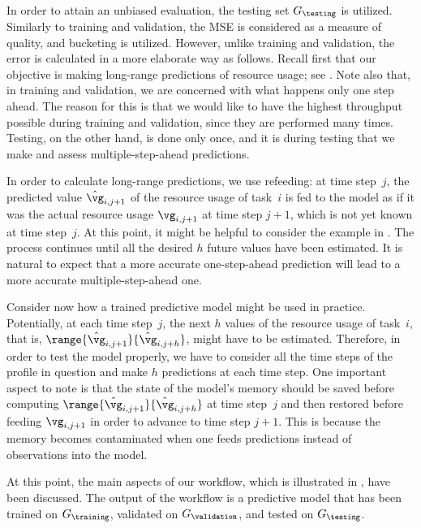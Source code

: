 In order to attain an unbiased evaluation, the testing set $G_\testing$ is
utilized. Similarly to training and validation, the \ac{MSE} is considered as a
measure of quality, and bucketing is utilized. However, unlike training and
validation, the error is calculated in a more elaborate way as follows. Recall
first that our objective is making long-range predictions of resource usage; see
. Note also that, in training and validation, we are
concerned with what happens only one step ahead. The reason for this is that we
would like to have the highest throughput possible during training and
validation, since they are performed many times. Testing, on the other hand, is
done only once, and it is during testing that we make and assess
multiple-step-ahead predictions.

In order to calculate long-range predictions, we use refeeding: at time
step~$j$, the predicted value $\hat{\vg}_{i, j + 1}$ of the resource usage of
task~$i$ is fed to the model as if it was the actual resource usage $\vg_{i, j +
1}$ at time step $j + 1$, which is not yet known at time step~$j$. At this
point, it might be helpful to consider the example in .
The process continues until all the desired $h$ future values have been
estimated. It is natural to expect that a more accurate one-step-ahead
prediction will lead to a more accurate multiple-step-ahead one.

Consider now how a trained predictive model might be used in practice.
Potentially, at each time step~$j$, the next $h$ values of the resource usage of
task~$i$, that is, $\range{\hat{\vg}_{i, j + 1}}{\hat{\vg}_{i, j + h}}$, might
have to be estimated. Therefore, in order to test the model properly, we have to
consider all the time steps of the profile in question and make $h$ predictions
at each time step. One important aspect to note is that the state of the model's
memory should be saved before computing $\range{\hat{\vg}_{i, j +
1}}{\hat{\vg}_{i, j + h}}$ at time step~$j$ and then restored before feeding
$\vg_{i, j + 1}$ in order to advance to time step $j + 1$. This is because the
memory becomes contaminated when one feeds predictions instead of observations
into the model.

At this point, the main aspects of our workflow, which is illustrated in
, have been discussed. The output of the workflow is a
predictive model that has been trained on $G_\training$, validated on
$G_\validation$, and tested on $G_\testing$.
